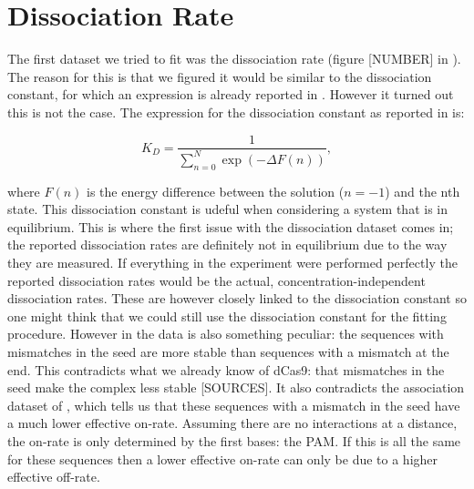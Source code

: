 \section{Dissociation Rate}


The first dataset we tried to fit was the dissociation rate (figure [NUMBER] in \cite{PNAS}). %
The reason for this is that we figured it would be similar to the dissociation constant, for which an expression is already reported in \cite{Misha}. %
However it turned out this is not the case. The expression for the dissociation constant as reported in \cite{Misha} is: %

\begin{equation}
K_D = \frac{1}{\sum_{n=0}^{N} \exp{(-\Delta F(n))}},
\end{equation}

where $F(n)$ is the energy difference between the solution ($n=-1$) and the nth state. This dissociation constant is udeful when considering a system that is in equilibrium. This is where the first issue with the dissociation dataset comes in; the reported dissociation rates are definitely not in equilibrium due to the way they are measured. If everything in the experiment were performed perfectly the reported dissociation rates would be the actual, concentration-independent dissociation rates. These are however closely linked to the dissociation constant so one might think that we could still use the dissociation constant for the fitting procedure. However in the data is also something peculiar: the sequences with mismatches in the seed are more stable than sequences with a mismatch at the end. This contradicts what we already know of dCas9: that mismatches in the seed make the complex less stable [SOURCES]. It also contradicts the association dataset of \cite{PNAS}, which tells us that these sequences with a mismatch in the seed have a much lower effective on-rate. Assuming there are no interactions at a distance, the on-rate is only determined by the first bases: the PAM. If this is all the same for these sequences then a lower effective on-rate can only be due to a higher effective off-rate.

